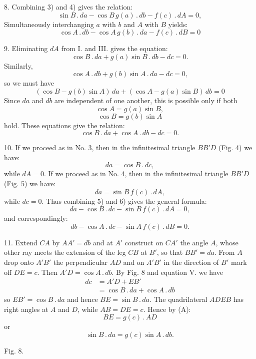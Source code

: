 %
8. Combining 3) and 4) gives the relation:
\[
\tag*{III.} \sin B \,.\, da - \cos B\, g(a) \,.\, db - f(c) \,.\, dA = 0,
\]
Simultaneously interchanging $a$ with $b$ and $A$ with $B$ yields:
\[
\tag*{IV.} \cos A \,.\, db - \cos A\, g(b) \,.\, da - f(c) \,.\, dB = 0
\]

9. Eliminating $dA$ from I. and III. gives the equation:
\[
\cos B \,.\, da + g(a) \sin B \,.\, db - dc = 0.
\]
Similarly,
\[
\cos A \,.\, db + g(b) \sin A \,.\, da - dc = 0,
\]
so we must have
\[
(\cos B - g(b) \sin A)\, da + (\cos A - g(a) \sin B)\, db = 0
\]
Since $da$ and $db$ are independent of one another, this is possible only
if both
\[
\tag*{V. 1)} \cos A = g(a) \sin B,
\]
\[
\tag*{V. 2)} \cos B = g(b) \sin A
\]
hold. These equations give the relation:
\[
\tag*{V.} \cos B \,.\, da + \cos A \,.\, db - dc = 0.
\]

10. If we proceed as in No. 3, then in the infinitesimal triangle $BB'D$
(Fig. 4) we have:
\[
\tag*{5)} da = \cos B \,.\, dc,
\]
while $dA = 0$. If we proceed as in No. 4, then in the infinitesimal triangle
$BB'D$ (Fig. 5) we have:
\[
\tag*{6)} da = \sin B\, f(c) \,.\, dA,
\]
while $dc = 0$. Thus combining 5) and 6) gives the general formula:
\[
\tag*{VI.} da - \cos B \,.\, dc - \sin B\, f(c) \,.\, dA = 0,
\]
and correspondingly:
\[
\tag*{VII.} db - \cos A \,.\, dc - \sin A\, f(c) \,.\, dB = 0.
\]

11. Extend $CA$ by $AA' = db$ and at $A'$ construct on $CA'$ the angle
$A$, whose other ray meets the extension of the leg $CB$ at $B'$,
so that $BB' = da$. From $A$ drop onto $A'B'$ the perpendicular $AD$
and on $A'B'$ in the direction of $B'$ mark off $DE = c$. Then $A'D = \cos A \,.\, db$.
By Fig. 8 and equation V. we have
\[
\begin{aligned}dc &= A'D + EB'\\ &= \cos B \,.\, da + \cos A \,.\, db\end{aligned}
\]
so $EB' = \cos B \,.\, da$ and hence $BE = \sin B \,.\, da$. The quadrilateral $ADEB$ has right angles at
$A$ and $D$, while $AB = DE = c$. Hence by (A):
\[
BE = g(c) \,.\, AD
\]
or
\[
\sin B \,.\, da = g(c) \sin A \,.\, db.
\]

\begin{center}\begin{minipage}{\linewidth}\centering


Fig. 8.
\end{minipage}\end{center}
